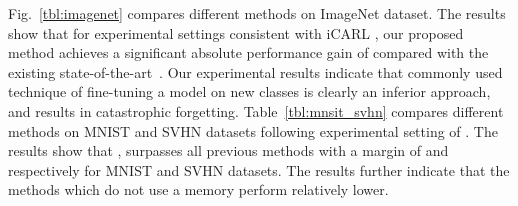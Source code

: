 \begin{table}[htp]
\begin{minipage}{0.48\textwidth}
\vspace{0.5cm}


            \begin{center}
            \end{center}
            \label{tbl:mnsit_svhn}
\end{minipage}  
\end{table}


Fig.~\ref{tbl:imagenet} compares different methods on ImageNet dataset. The results show that for experimental settings consistent with iCARL \cite{rebuffi2017icarl}, our proposed method achieves a significant absolute performance gain of  compared with the existing state-of-the-art~\cite{rebuffi2017icarl}. Our experimental results indicate that commonly used technique of fine-tuning a model on new classes is clearly an inferior approach, and results in catastrophic forgetting.
Table~\ref{tbl:mnsit_svhn} compares different methods on MNIST and SVHN datasets following experimental setting of \cite{Hsu18_EvalCL}. The results show that \ours{}, surpasses all previous methods with a margin of  and  respectively for MNIST and SVHN datasets. The results further indicate that the methods which do not use a memory perform relatively lower.












